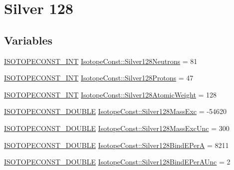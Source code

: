 \hypertarget{group___isotope_const-_silver-_ag128}{}\section{Silver 128}
\label{group___isotope_const-_silver-_ag128}
\subsection*{Variables}
\begin{DoxyCompactItemize}
\item 
\mbox{\hyperlink{group___isotope_const-_macros_ga5f18360b3e99483a35c32d789e62621c}{I\+S\+O\+T\+O\+P\+E\+C\+O\+N\+S\+T\+\_\+\+I\+NT}} \mbox{\hyperlink{group___isotope_const-_silver-_ag128_gac7ff9ce9c0aa20c74b5ccfa4e6c0e668}{Isotope\+Const\+::\+Silver128\+Neutrons}} = 81
\item 
\mbox{\hyperlink{group___isotope_const-_macros_ga5f18360b3e99483a35c32d789e62621c}{I\+S\+O\+T\+O\+P\+E\+C\+O\+N\+S\+T\+\_\+\+I\+NT}} \mbox{\hyperlink{group___isotope_const-_silver-_ag128_ga1fe0d048c7348dab410afd0d6d084d26}{Isotope\+Const\+::\+Silver128\+Protons}} = 47
\item 
\mbox{\hyperlink{group___isotope_const-_macros_ga5f18360b3e99483a35c32d789e62621c}{I\+S\+O\+T\+O\+P\+E\+C\+O\+N\+S\+T\+\_\+\+I\+NT}} \mbox{\hyperlink{group___isotope_const-_silver-_ag128_ga24dfee684454b9b98f22607d2e6105f7}{Isotope\+Const\+::\+Silver128\+Atomic\+Weight}} = 128
\item 
\mbox{\hyperlink{group___isotope_const-_macros_ga8f45a7272ce02c0b4c65c44636ed719a}{I\+S\+O\+T\+O\+P\+E\+C\+O\+N\+S\+T\+\_\+\+D\+O\+U\+B\+LE}} \mbox{\hyperlink{group___isotope_const-_silver-_ag128_gab986c7a4f4b157992abfdf2412de0463}{Isotope\+Const\+::\+Silver128\+Mass\+Exc}} = -\/54620
\item 
\mbox{\hyperlink{group___isotope_const-_macros_ga8f45a7272ce02c0b4c65c44636ed719a}{I\+S\+O\+T\+O\+P\+E\+C\+O\+N\+S\+T\+\_\+\+D\+O\+U\+B\+LE}} \mbox{\hyperlink{group___isotope_const-_silver-_ag128_gaf36822e2fb1063f099ab3ca29d08f027}{Isotope\+Const\+::\+Silver128\+Mass\+Exc\+Unc}} = 300
\item 
\mbox{\hyperlink{group___isotope_const-_macros_ga8f45a7272ce02c0b4c65c44636ed719a}{I\+S\+O\+T\+O\+P\+E\+C\+O\+N\+S\+T\+\_\+\+D\+O\+U\+B\+LE}} \mbox{\hyperlink{group___isotope_const-_silver-_ag128_ga8a7ff0db43d05abd752b0d7850473d32}{Isotope\+Const\+::\+Silver128\+Bind\+E\+PerA}} = 8211
\item 
\mbox{\hyperlink{group___isotope_const-_macros_ga8f45a7272ce02c0b4c65c44636ed719a}{I\+S\+O\+T\+O\+P\+E\+C\+O\+N\+S\+T\+\_\+\+D\+O\+U\+B\+LE}} \mbox{\hyperlink{group___isotope_const-_silver-_ag128_gaae70e58e676bcf218901722847f5408b}{Isotope\+Const\+::\+Silver128\+Bind\+E\+Per\+A\+Unc}} = 2

\end{DoxyCompactItemize}
